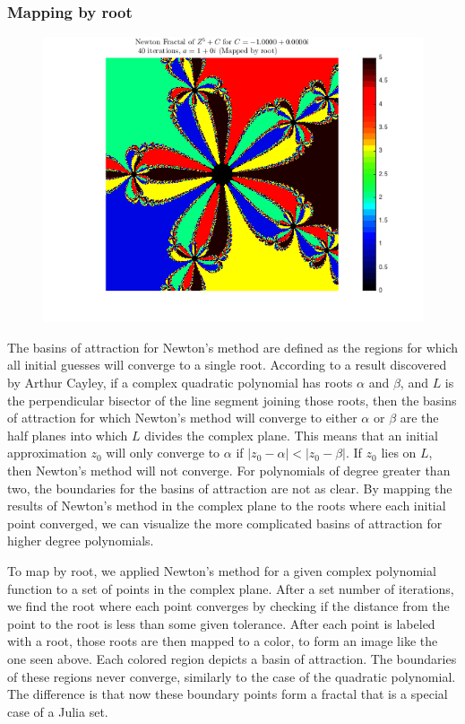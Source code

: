 \documentclass[12pt]{article}
\begin{document}
\begin{onehalfspace}
\subsubsection*{Mapping by root}
\begin{figure}[H]
\centering
\includegraphics[width=0.7\linewidth]{images/rootEx2}
\caption{}
\label{fig:rootEx2}
\end{figure}
The basins of attraction for Newton’s method are defined as the regions  for which all initial guesses will converge to a single root.  According to a result discovered by Arthur Cayley, if a complex quadratic polynomial has roots $\alpha$ and $\beta$, and $L$ is the perpendicular bisector of the line segment joining those roots, then the basins of attraction for which Newton’s method will converge to either $\alpha$ or $\beta$ are the half planes into which $L$ divides the complex plane.  This means that an initial approximation $z_{0}$ will only converge to $\alpha$ if $|z_{0} - \alpha| < |z_{0} - \beta|$.  If $z_{0}$ lies on $L$, then Newton’s method will not converge.  For polynomials of degree greater than two, the boundaries for the basins of attraction are not as clear.  By mapping the results of Newton’s method in the complex plane to the roots where each initial point converged, we can visualize the more complicated basins of attraction for higher degree polynomials. 

To map by root, we applied Newton’s method for a given complex polynomial function to a set of points in the complex plane.  After a set number of iterations, we find the root where each point converges by checking if the distance from the point to the root is less than some given tolerance.  After each point is labeled with a root, those roots are then mapped to a color, to form an image like the one seen above.  Each colored region depicts a basin of attraction.  The boundaries of these regions never converge, similarly to the case of the quadratic polynomial.  The difference is that now these boundary points form a fractal that is a special case of a Julia set. 


\end{onehalfspace}
\end{document}

